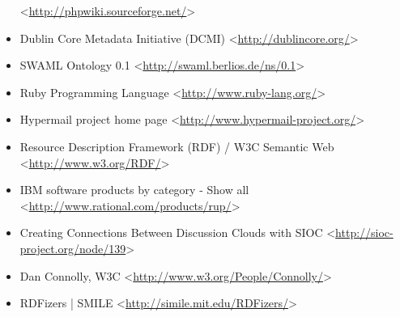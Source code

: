 \begin{itemize}
 <\url{http://phpwiki.sourceforge.net/}>
 \item Dublin Core Metadata Initiative (DCMI)
 <\url{http://dublincore.org/}>
 \item SWAML Ontology 0.1
 <\url{http://swaml.berlios.de/ns/0.1}>
 \item Ruby Programming Language
 <\url{http://www.ruby-lang.org/}>
 \item Hypermail project home page
 <\url{http://www.hypermail-project.org/}>
 \item Resource Description Framework (RDF) / W3C Semantic Web
 <\url{http://www.w3.org/RDF/}>
 \item IBM software products by category - Show all
 <\url{http://www.rational.com/products/rup/}>
 \item Creating Connections Between Discussion Clouds with SIOC
 <\url{http://sioc-project.org/node/139}>
 \item Dan Connolly, W3C
 <\url{http://www.w3.org/People/Connolly/}>
 \item RDFizers | SMILE
 <\url{http://simile.mit.edu/RDFizers/}>
\end{itemize}
